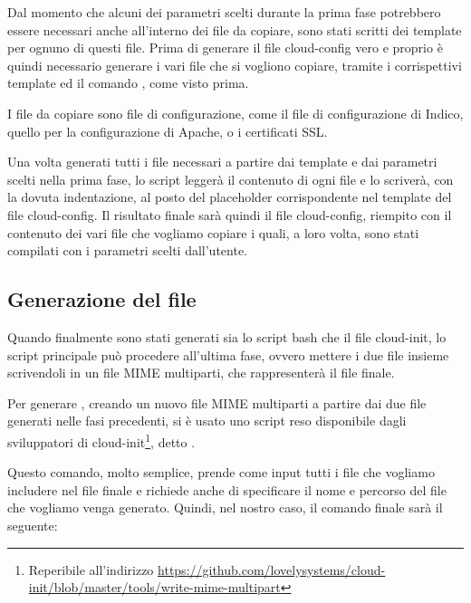             Dal momento che alcuni dei parametri scelti durante la prima fase potrebbero essere necessari anche all'interno dei file da copiare, sono stati scritti dei template per ognuno di questi file. Prima di generare il file cloud-config vero e proprio è quindi necessario generare i vari file che si vogliono copiare, tramite i corrispettivi template ed il comando , come visto prima.
            
            I file da copiare sono file di configurazione, come il file di configurazione di Indico, quello per la configurazione di Apache, o i certificati \ac{SSL}.
            
            Una volta generati tutti i file necessari a partire dai template e dai parametri scelti nella prima fase, lo script leggerà il contenuto di ogni file e lo scriverà, con la dovuta indentazione, al posto del placeholder corrispondente nel template del file cloud-config. Il risultato finale sarà quindi il file cloud-config, riempito con il contenuto dei vari file che vogliamo copiare i quali, a loro volta, sono stati compilati con i parametri scelti dall'utente.
        
        \subsection{Generazione del file } \label{subsec:cd;dci;generazione_user-data}
        
            Quando finalmente sono stati generati sia lo script bash che il file cloud-init, lo script principale può procedere all'ultima fase, ovvero mettere i due file insieme scrivendoli in un file \ac{MIME} multiparti, che rappresenterà il file  finale.
            
            Per generare , creando un nuovo file \ac{MIME} multiparti a partire dai due file generati nelle fasi precedenti, si è usato uno script reso disponibile dagli sviluppatori di cloud-init\footnote{Reperibile all'indirizzo \url{https://github.com/lovelysystems/cloud-init/blob/master/tools/write-mime-multipart}}, detto .
            
            Questo comando, molto semplice, prende come input tutti i file che vogliamo includere nel file finale e richiede anche di specificare il nome e percorso del file che vogliamo venga generato. Quindi, nel nostro caso, il comando finale sarà il seguente:
            
